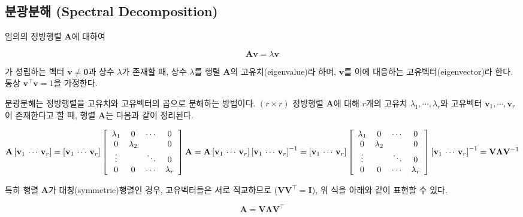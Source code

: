 \documentclass[
]{book}
\begin{document}
\hypertarget{pca-spectral}{%
\subsection{분광분해 (Spectral Decomposition)}\label{pca-spectral}}

임의의 정방행렬 \(\mathbf{A}\)에 대하여

\[\mathbf{A}\mathbf{v} = \lambda\mathbf{v} \]

가 성립하는 벡터 \(\mathbf{v} \neq \mathbf{0}\)과 상수 \(\lambda\)가 존재할 때, 상수 \(\lambda\)를 행렬 \(\mathbf{A}\)의 고유치(eigenvalue)라 하며, \(\mathbf{v}\)를 이에 대응하는 고유벡터(eigenvector)라 한다. 통상 \(\mathbf{v}^\top \mathbf{v} = 1\)을 가정한다.

분광분해는 정방행렬을 고유치와 고유벡터의 곱으로 분해하는 방법이다. \((r \times r)\) 정방행렬 \(\mathbf{A}\)에 대해 \(r\)개의 고유치 \(\lambda_1, \cdots, \lambda_r\)와 고유벡터 \(\mathbf{v}_1, \cdots, \mathbf{v}_r\)이 존재한다고 할 때, 행렬 \(\mathbf{A}\)는 다음과 같이 정리된다.

\[
\mathbf{A}\left[\mathbf{v}_1 \, \cdots \, \mathbf{v}_r\right] = \left[\mathbf{v}_1 \, \cdots \, \mathbf{v}_r\right] \left[ \begin{array}{c c c c}
\lambda_1 & 0 & \cdots & 0\\
0 & \lambda_2 &  & 0\\
\vdots &  & \ddots & 0\\
0 & 0 & \cdots & \lambda_r
\end{array} \right] \\
\mathbf{A} = \mathbf{A} \left[\mathbf{v}_1 \, \cdots \, \mathbf{v}_r\right] \left[\mathbf{v}_1 \, \cdots \, \mathbf{v}_r\right]^{-1} = \left[\mathbf{v}_1 \, \cdots \, \mathbf{v}_r\right] \left[ \begin{array}{c c c c}
\lambda_1 & 0 & \cdots & 0\\
0 & \lambda_2 &  & 0\\
\vdots &  & \ddots & 0\\
0 & 0 & \cdots & \lambda_r
\end{array} \right] \left[\mathbf{v}_1 \, \cdots \, \mathbf{v}_r\right]^{-1} = \mathbf{V} \mathbf{\Lambda} \mathbf{V}^{-1}
\]

특히 행렬 \(\mathbf{A}\)가 대칭(symmetric)행렬인 경우, 고유벡터들은 서로 직교하므로 (\(\mathbf{V}\mathbf{V}^\top = \mathbf{I}\)), 위 식을 아래와 같이 표현할 수 있다.

\[ \mathbf{A} = \mathbf{V} \mathbf{\Lambda} \mathbf{V}^\top \]
\end{document}
